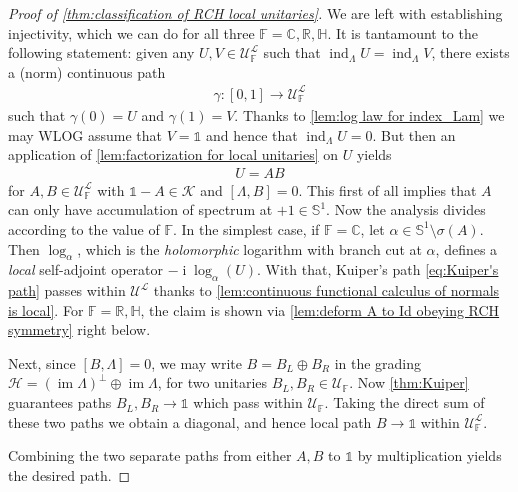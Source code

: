 \documentclass[a4paper,10pt]{article}
\numberwithin{equation}{section}
\theoremstyle{plain}
\theoremstyle{plain}
\theoremstyle{plain}
\theoremstyle{plain}
\theoremstyle{plain}
\theoremstyle{remark}
\theoremstyle{definition}
\theoremstyle{plain}
\newcommand{\ii}{\operatorname{i}}
\newcommand{\bS}{\mathbb{S}}
\newcommand{\RR}{\mathbb{R}}
\newcommand{\CC}{\mathbb{C}}
\newcommand{\FF}{\mathbb{F}}
\newcommand{\calU}{\mathcal{U}}
\newcommand{\calH}{\mathcal{H}}
\newcommand{\calK}{\mathcal{K}}
\newcommand{\calL}{\mathcal{L}}
\newcommand{\Id}{\mathds{1}}
\newcommand{\HH}{\mathbb{H}}
\newcommand{\findex}{\operatorname{ind}}
\newcommand{\im}{\operatorname{im}}
\newcommand{\eq}[1]{\begin{align*}#1\end{align*}}
\begin{document}
\begin{proof}[Proof of \cref{thm:classification of RCH local unitaries}]
		We are left with establishing injectivity, which we can do for all three  $\FF=\CC,\RR,\HH$. It is tantamount to the following statement: given any $U,V\in\calU_\FF^\calL$ such that $\findex_\Lambda U = \findex_\Lambda V$, there exists a (norm) continuous path \eq{ \gamma:[0,1]\to \calU_\FF^\calL} such that $\gamma(0)=U$ and $\gamma(1)=V$. Thanks to \cref{lem:log law for index_Lam} we may WLOG assume that $V=\Id$ and hence that $\findex_\Lambda U =0$. But then an application of \cref{lem:factorization for local unitaries} on $U$ yields \eq{ U=AB } for $A,B\in\calU_\FF^\calL$ with $\Id-A\in\calK$ and $[\Lambda,B]=0$. This first of all implies that $A$ can only have accumulation of spectrum at $+1\in\bS^1$. Now the analysis divides according to the value of $\FF$. In the simplest case, if $\FF=\CC$, let $\alpha\in\bS^1\setminus\sigma(A)$. Then $\log_\alpha$, which is the \emph{holomorphic} logarithm with branch cut at $\alpha$, defines a \emph{local} self-adjoint operator $-\ii \log_\alpha(U)$. With that, Kuiper's path \cref{eq:Kuiper's path} passes within $\calU^\calL$ thanks to \cref{lem:continuous functional calculus of normals is local}. For $\FF=\RR,\HH$, the claim is shown via \cref{lem:deform A to Id obeying RCH symmetry} right below.
		
		Next, since $[B,\Lambda]=0$, we may write $B = B_L \oplus B_R$ in the grading $\calH =(\im\Lambda)^\perp\oplus\im\Lambda$, for two unitaries $B_L,B_R\in\calU_\FF$. Now \cref{thm:Kuiper} guarantees paths $B_L,B_R\to\Id$ which pass within $\calU_\FF$. Taking the direct sum of these two paths we obtain a diagonal, and hence local path $B\to\Id$ within $\calU_\FF^\calL$. 
		
		Combining the two separate paths from either $A,B$ to $\Id$ by multiplication yields the desired path.
	\end{proof}
	
\end{document}
